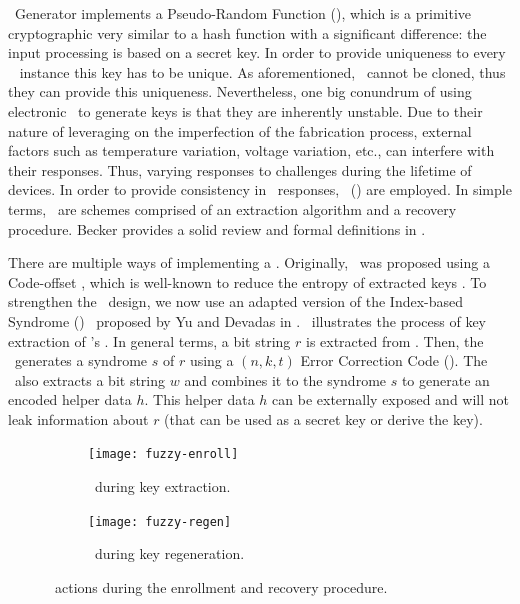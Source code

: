 \ptag~Generator implements a Pseudo-Random Function (\prf), which is a primitive cryptographic very similar to a hash function with a significant difference: the input processing is based on a secret key. In order to provide uniqueness to every \cshia~ instance this key has to be unique. As aforementioned, \pufs~cannot be cloned, thus they can provide this uniqueness. Nevertheless, one big conundrum of using electronic \pufs~to generate keys is that they are inherently unstable. Due to their nature of leveraging on the imperfection of the fabrication process, external factors such as temperature variation, voltage variation, etc., can interfere with their responses. Thus, varying responses to challenges during the lifetime of devices. In order to provide consistency in \puf~responses, \fuzzy~(\fe) are employed. In simple terms, \fes~are schemes comprised of an extraction algorithm and a recovery procedure. Becker provides a solid review and formal definitions in \cite{Becker2017:RobustFuzzyExtractor}.

There are multiple ways of implementing a \fuzzy. Originally, \cshia~was proposed using a Code-offset \fe, which is well-known to reduce the entropy of extracted keys \cite{Armknecht2011:Formalization}. To strengthen the \cshia~design, we now use an adapted version of the Index-based Syndrome (\ibs) \fe~proposed by Yu and Devadas in \cite{Yu2010:RobustErrorCorrection}. \fenroll~illustrates the process of key extraction of \cshia's \fe. In general terms, a bit string $r$ is extracted from \pufs. Then, the \fe~generates a syndrome $s$ of $r$ using a $(n,k,t)$ Error Correction Code (\ecc). The \fe~also extracts a bit string $w$ and combines it to the syndrome $s$ to generate an encoded helper data $h$. This helper data $h$ can be externally exposed and will not leak information about $r$ (that can be used as a secret key or derive the key).


\begin{figure}
     \centering
     \begin{subfigure}[b]{0.5\textwidth}
         \centering
         \texttt{[image: fuzzy-enroll]}
         \caption{\fuzzy~during key extraction.}
         \label{fig:fuzzy-enroll}
     \end{subfigure}
     \hfill
     \begin{subfigure}[b]{0.5\textwidth}
         \centering
         \texttt{[image: fuzzy-regen]}
         \caption{\fuzzy~during key regeneration.}
         \label{fig:fuzzy-regen}
     \end{subfigure}

        \caption{\fuzzy~actions during the enrollment and recovery procedure.}
        \label{fig:fuzzy-extractor}
\end{figure}


